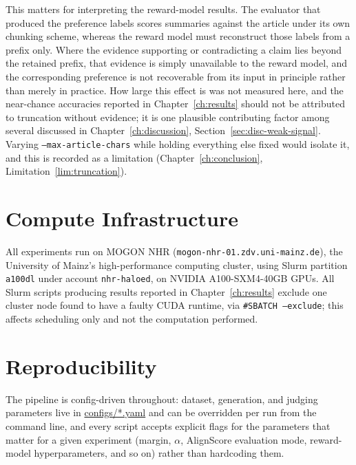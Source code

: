 This matters for interpreting the reward-model results. The evaluator that
produced the preference labels scores summaries against the article under its own
chunking scheme, whereas the reward model must reconstruct those labels from a
prefix only. Where the evidence supporting or contradicting a claim lies beyond
the retained prefix, that evidence is simply unavailable to the reward model, and
the corresponding preference is not recoverable from its input in principle rather
than merely in practice. How large this effect is was not measured here, and the
near-chance accuracies reported in Chapter~\ref{ch:results} should not be
attributed to truncation without evidence; it is one plausible contributing factor
among several discussed in Chapter~\ref{ch:discussion},
Section~\ref{sec:disc-weak-signal}. Varying \texttt{--max-article-chars} while
holding everything else fixed would isolate it, and this is recorded as a
limitation (Chapter~\ref{ch:conclusion},
Limitation~\ref{lim:truncation}).

\section{Compute Infrastructure}
\label{sec:impl-infra}

All experiments run on MOGON NHR (\texttt{mogon-nhr-01.zdv.uni-mainz.de}), the
University of Mainz's high-performance computing cluster, using Slurm partition
\texttt{a100dl} under account \texttt{nhr-haloed}, on NVIDIA A100-SXM4-40GB GPUs.
All Slurm scripts producing results reported in Chapter~\ref{ch:results} exclude
one cluster node found to have a faulty CUDA runtime, via
\texttt{\#SBATCH --exclude}; this affects scheduling only and not the computation
performed.

\section{Reproducibility}
\label{sec:impl-repro}

The pipeline is config-driven throughout: dataset, generation, and judging
parameters live in \url{configs/*.yaml} and can be overridden per run from the
command line, and every script accepts explicit flags for the parameters that
matter for a given experiment (margin, $\alpha$, AlignScore evaluation mode,
reward-model hyperparameters, and so on) rather than hardcoding them.

